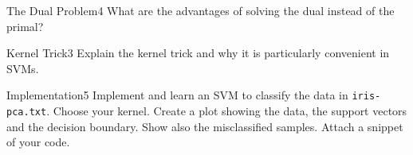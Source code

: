 \begin{questions}
\begin{question}{The Dual Problem}{4}
What are the advantages of solving the dual instead of the primal?
	
\begin{answer}\end{answer}
\end{question}


\begin{question}{Kernel Trick}{3}
Explain the kernel trick and why it is particularly convenient in SVMs.

\begin{answer}\end{answer}
\end{question}


\begin{question}[bonus]{Implementation}{5}
Implement and learn an SVM to classify the data in \texttt{iris-pca.txt}. Choose your kernel. Create a plot showing the data, the support vectors and the decision boundary. Show also the misclassified samples. Attach a snippet of your code.

\begin{answer}\end{answer}

\end{question}

\end{questions}
